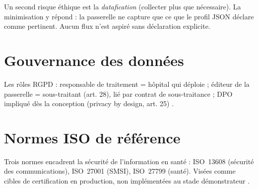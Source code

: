 Un second risque éthique est la \emph{datafication} (collecter plus que nécessaire). La minimisation y répond : la passerelle ne capture que ce que le profil JSON déclare comme pertinent. Aucun flux n'est aspiré sans déclaration explicite.

\section{Gouvernance des données}
\label{sec:ethique-gouvernance}

Les rôles RGPD : responsable de traitement = hôpital qui déploie ; éditeur de la passerelle = sous-traitant (art. 28), lié par contrat de sous-traitance ; DPO impliqué dès la conception (privacy by design, art. 25) \cite{esante_wallonie_rgpd}.

\section{Normes ISO de référence}
\label{sec:ethique-iso}

Trois normes encadrent la sécurité de l'information en santé : ISO~13608 (sécurité des communications), ISO~27001 (SMSI), ISO~27799 (santé). Visées comme cibles de certification en production, non implémentées au stade démonstrateur \cite{iso_13608,iso_27001,iso_27799}.
